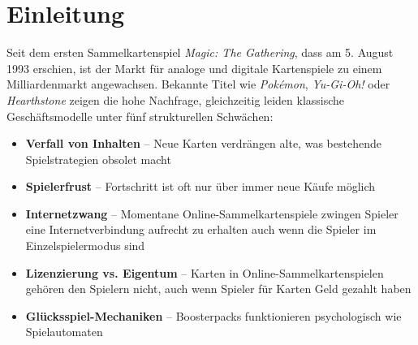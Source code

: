 \documentclass[fontsize=12]{scrartcl}
\begin{document}
	\newpage
	
	\section{Einleitung}
	
	Seit dem ersten Sammelkartenspiel \textit{Magic: The Gathering}, dass am 5. August 1993 erschien, ist der Markt für analoge und digitale Kartenspiele zu einem Milliardenmarkt angewachsen. Bekannte Titel wie \textit{Pokémon}, \textit{Yu-Gi-Oh!} oder \textit{Hearthstone} zeigen die hohe Nachfrage, gleichzeitig leiden klassische Geschäftsmodelle unter fünf strukturellen Schwächen:
	
	\begin{itemize}
		
		\item \textbf{Verfall von Inhalten} -- Neue Karten verdrängen alte, was bestehende Spielstrategien obsolet macht
		
		\item \textbf{Spielerfrust} -- Fortschritt ist oft nur über immer neue Käufe möglich
		
		\item \textbf{Internetzwang} -- Momentane Online-Sammelkartenspiele zwingen Spieler eine Internetverbindung aufrecht zu erhalten auch wenn die Spieler im Einzelspielermodus sind
		
		\item \textbf{Lizenzierung vs. Eigentum} -- Karten in Online-Sammelkartenspielen gehören den Spielern nicht, auch wenn Spieler für Karten Geld gezahlt haben
		
		\item \textbf{Glücksspiel-Mechaniken} -- Boosterpacks funktionieren psychologisch wie Spielautomaten
		
	\end{itemize}
	
	
	
	
\end{document}
